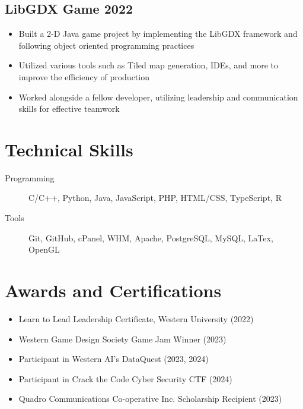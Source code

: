 \documentclass[11pt]{article}
\begin{document}
\subsection{LibGDX Game \hfill 2022}
\begin{itemize}[left=0pt..1em]
  \item{Built a 2-D Java game project by implementing the LibGDX framework and following object oriented programming practices}
  \item{Utilized various tools such as Tiled map generation, IDEs, and more to improve the efficiency of production}
  \item{Worked alongside a fellow developer, utilizing leadership and communication skills for effective teamwork}
\end{itemize}  


\section{Technical Skills}
\begin{description}
  \item[Programming] C/C++, Python, Java, JavaScript, PHP, HTML/CSS, TypeScript, R
  \item[Tools] Git, GitHub, cPanel, WHM, Apache, PostgreSQL, MySQL, LaTex, OpenGL
\end{description}

\section{Awards and Certifications}
\begin{itemize}[left=0pt..1em]
  \item Learn to Lead Leadership Certificate, Western University (2022)
  \item Western Game Design Society Game Jam Winner (2023)
  \item Participant in Western AI's DataQuest (2023, 2024)
  \item Participant in Crack the Code Cyber Security CTF (2024)
  \item Quadro Communications Co-operative Inc. Scholarship Recipient (2023)
\end{itemize}
\end{document}

